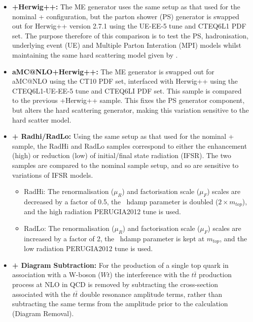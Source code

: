 \begin{itemize}
\item \textbf{\POWHEG+Herwig++:} The ME \POWHEG \;generator uses the same setup as that used for the nominal \POWHEG+ configuration,
but the parton shower (PS) generator is swapped out for Herwig++ version 2.7.1 using the UE-EE-5 tune and CTEQ6L1 PDF set.
The purpose therefore of this comparison is to test the PS, hadronisation, underlying event (UE) and Multiple Parton Interation (MPI) models
whilst maintaining the same hard scattering model given by \POWHEG.
 
\item \textbf{aMC@NLO+Herwig++:} The ME generator is swapped out for aMC@NLO using the CT10 PDF set, interfaced with Herwig++
using the CTEQ6L1-UE-EE-5 tune and CTEQ6LI PDF set. This sample is compared to the previous \POWHEG+Herwig++ sample.
This fixes the PS generator component, but alters the hard scattering generator, making this variation sensitive to the hard scatter model.
 
\item \textbf{\POWHEG+ Radhi/RadLo:} Using the same setup as that used for the nominal \POWHEG+ sample,
the RadHi and RadLo samples correspond to either the enhancement (high) or reduction (low) of initial/final state radiation (IFSR).
The two samples are compared to the nominal sample setup, and so are sensitive to variations of IFSR models.
   \begin{itemize}
   \item RadHi: The renormalisation ($\mu_{R}$) and factorisation scale ($\mu_{F}$) scales are decreased by a factor of 0.5,
   the \POWHEG \, \textsf{hdamp} parameter is doubled ($2 \times m_{top}$), and the high radiation PERUGIA2012 tune is used.
   \item RadLo: The renormalisation ($\mu_{R}$) and factorisation scale ($\mu_{F}$) scales are increased by a factor of 2,
   the \POWHEG \, \textsf{hdamp} parameter is kept at $m_{top}$, and the low radiation PERUGIA2012 tune is used.
   \end{itemize}
 
\item \textbf{\POWHEG+ Diagram Subtraction:} For the production of a single top quark in association with a W-boson ($Wt$)
the interference with the $t\bar{t}$ production process at NLO in QCD is removed by subtracting the cross-section
associated with the $t\bar{t}$ double resonance amplitude terms, rather than subtracting the same terms from the
amplitude prior to the calculation (Diagram Removal).
\end{itemize}
 
